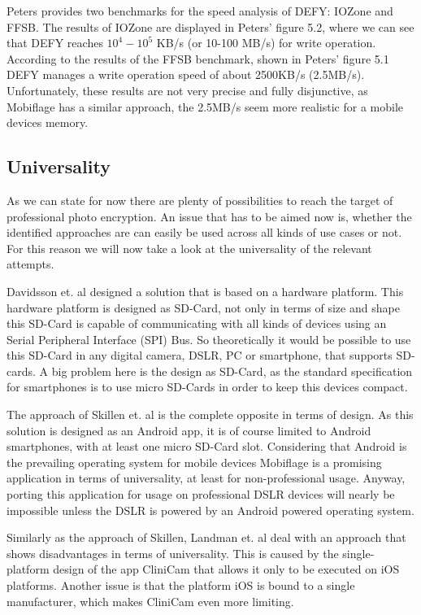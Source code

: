 \documentclass[12pt,a4paper,titlepage,oneside]{scrartcl}
\begin{document}
Peters\cite{peters2015defy} provides two benchmarks for the speed analysis of DEFY: IOZone and FFSB.
The results of IOZone are displayed in Peters' figure 5.2, where we can see that DEFY reaches \begin{math} 10^{4}-10^{5}\end{math} KB/s (or 10-100 MB/s) for write operation.
According to the results of the FFSB benchmark, shown in Peters' figure 5.1 DEFY manages a write operation speed of about 2500KB/s (2.5MB/s).
Unfortunately, these results are not very precise and fully disjunctive, as Mobiflage has a similar approach, the 2.5MB/s seem more realistic for a mobile devices memory.

\subsection{Universality}
As we can state for now there are plenty of possibilities to reach the target of professional photo encryption.
An issue that has to be aimed now is, whether the identified approaches are can easily be used across all kinds of use cases or not.
For this reason we will now take a look at the universality of the relevant attempts.

Davidsson et. al \cite{Davidsson2016} designed a solution that is based on a hardware platform.
This hardware platform is designed as SD-Card, not only in terms of size and shape this SD-Card is capable of communicating with all kinds of devices using an Serial Peripheral Interface (SPI) Bus.
So theoretically it would be possible to use this SD-Card in any digital camera, DSLR, PC or smartphone, that supports SD-cards.
A big problem here is the design as SD-Card, as the standard specification for smartphones is to use micro SD-Cards in order to keep this devices compact.

The approach of Skillen et. al \cite{skillen2013implementing} is the complete opposite in terms of design.
As this solution is designed as an Android app, it is of course limited to Android smartphones, with at least one micro SD-Card slot.
Considering that Android is the prevailing operating system for mobile devices Mobiflage is a promising application in terms of universality, at least for non-professional usage.
Anyway, porting this application for usage on professional DSLR devices will nearly be impossible unless the DSLR is powered by an Android powered operating system.

Similarly as the approach of Skillen, Landman et. al \cite{pmid25565678} deal with an approach that shows disadvantages in terms of universality.
This is caused by the single-platform design of the app CliniCam that allows it only to be executed on iOS platforms.
Another issue is that the platform iOS is bound to a single manufacturer, which makes CliniCam even more limiting.
\end{document}

